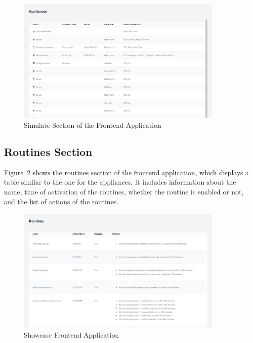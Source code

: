\begin{figure}
    \centering
    \includegraphics[width=0.9\textwidth]{images/frontend/appliances.png}
    \caption{Simulate Section of the Frontend Application}
    \label{fig:frontend_appliances}
\end{figure}

\subsection{Routines Section}

Figure~\ref{fig:frontend_routines} shows the routines section of the frontend application, which displays a table similar to the one for the appliances. It includes information about the name, time of activation of the routines, whether the routine is enabled or not, and the list of actions of the routines.

\begin{figure}
    \centering
    \includegraphics[width=0.9\textwidth]{images/frontend/routines.png}
    \caption{Showcase Frontend Application}
    \label{fig:frontend_routines}
\end{figure}